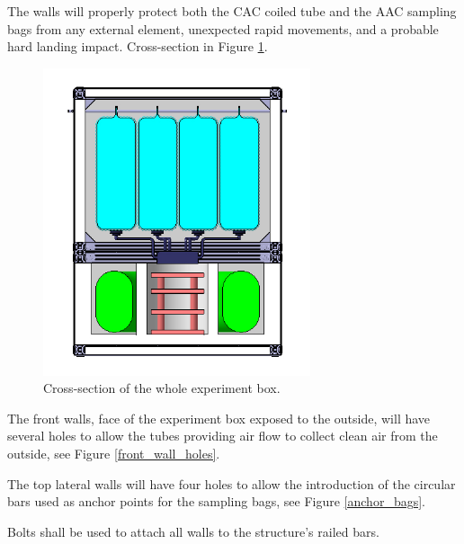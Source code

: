 The walls will properly protect both the CAC coiled tube and the AAC sampling bags from any external element, unexpected rapid movements, and a probable hard landing impact. Cross-section in Figure \ref{cut_all}. 



\begin{figure}[!ht]
    \centering
    \includegraphics[width=0.7\textwidth]{4-experiment-design/img/tall_frontal.jpg}
    \caption{Cross-section of the whole experiment box.}
    \label{cut_all}
\end{figure}

The front walls, face of the experiment box exposed to the outside, will have several holes to allow the tubes providing air flow to collect clean air from the outside, see Figure \ref{front_wall_holes}.

The top lateral walls will have four holes to allow the introduction of the circular bars used as anchor points for the sampling bags, see Figure \ref{anchor_bags}.

Bolts shall be used to attach all walls to the structure's railed bars.


